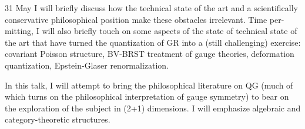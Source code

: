 \documentclass{conference}
\begin{document}
\begin{Day}{31 May}
{I will briefly discuss how the technical state of the art and a scientifically conservative philosophical position make these obstacles irrelevant. Time per- mitting, I will also briefly touch on some aspects of the state of technical state of the art that have turned the quantization of GR into a (still challenging) exercise: covariant Poisson structure, BV-BRST treatment of gauge theories, deformation quantization, Epstein-Glaser renormalization.}

  {In this talk, I will attempt to bring the philosophical literature on QG (much of which turns on the philosophical interpretation of gauge symmetry) to bear on the exploration of the subject in (2+1) dimensions. I will emphasize algebraic and category-theoretic structures.}

\end{Day}
\end{document}
